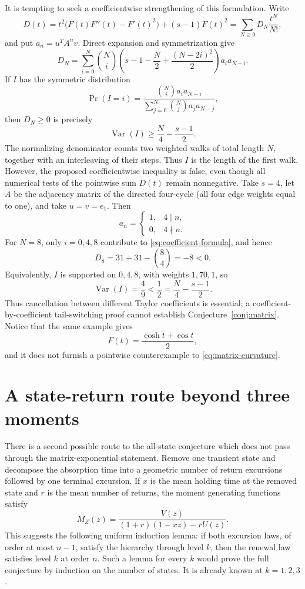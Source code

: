 \documentclass[11pt]{article}
\newcommand{\Var}{\operatorname{Var}}
\theoremstyle{remark}
\begin{document}
It is tempting to seek a coefficientwise strengthening of this formulation.
Write
\[
 D(t)=t^2\bigl(F(t)F''(t)-F'(t)^2\bigr)+(s-1)F(t)^2
     =\sum_{N\geq0}D_N\frac{t^N}{N!},
\]
and put \(a_n=u^TA^nv\).  Direct expansion and symmetrization give
\begin{equation}\label{eq:coefficient-formula}
 D_N=\sum_{i=0}^N\binom Ni
 \left(s-1-\frac N2+\frac{(N-2i)^2}{2}\right)a_i a_{N-i}.
\end{equation}
If \(I\) has the symmetric distribution
\[
 \Pr(I=i)=
 \frac{\binom Ni a_i a_{N-i}}
      {\sum_{j=0}^N\binom Nj a_j a_{N-j}},
\]
then \(D_N\geq0\) is precisely
\begin{equation}\label{eq:split-variance}
 \Var(I)\geq\frac N4-\frac{s-1}{2}.
\end{equation}
The normalizing denominator counts two weighted walks of total length \(N\),
together with an interleaving of their steps.  Thus \(I\) is the length of
the first walk.  However, the proposed coefficientwise inequality is false,
even though all numerical tests of the pointwise sum \(D(t)\) remain
nonnegative.  Take \(s=4\), let \(A\) be the adjacency matrix of the directed
four-cycle (all four edge weights equal to one), and take \(u=v=e_1\).  Then
\[
 a_n=\begin{cases}1,&4\mid n,\\0,&4\nmid n.\end{cases}
\]
For \(N=8\), only \(i=0,4,8\) contribute to
\eqref{eq:coefficient-formula}, and hence
\[
 D_8=31+31-\binom84=-8<0.
\]
Equivalently, \(I\) is supported on \(0,4,8\), with weights \(1,70,1\), so
\[
 \Var(I)=\frac49<\frac12
       =\frac N4-\frac{s-1}{2}.
\]
Thus cancellation between different Taylor coefficients is essential; a
coefficient-by-coefficient tail-switching proof cannot establish
Conjecture~\ref{conj:matrix}.  Notice that the same example gives
\[
 F(t)=\frac{\cosh t+\cos t}{2},
\]
and it does not furnish a pointwise counterexample to
\eqref{eq:matrix-curvature}.
\section{A state-return route beyond three moments}

There is a second possible route to the all-state conjecture which does not
pass through the matrix-exponential statement.  Remove one transient state
and decompose the absorption time into a geometric number of return
excursions followed by one terminal excursion.  If \(x\) is the mean holding
time at the removed state and \(r\) is the mean number of returns, the moment
generating functions satisfy
\[
 M_Z(z)=\frac{V(z)}{(1+r)(1-xz)-rU(z)}.
\]
This suggests the following uniform induction lemma: if both excursion laws,
of order at most \(n-1\), satisfy the hierarchy through level \(k\), then the
renewal law satisfies level \(k\) at order \(n\).  Such a lemma for every \(k\)
would prove the full conjecture by induction on the number of states.  It is
already known at \(k=1,2,3\).
\end{document}

